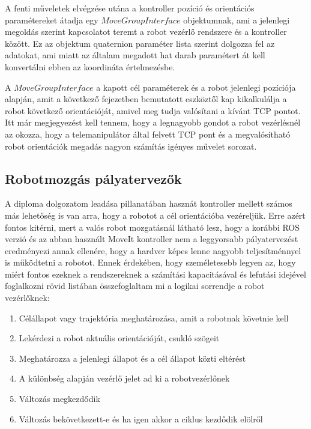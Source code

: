 A fenti műveletek elvégzése utána a kontroller pozíció és orientációs paramétereket átadja egy $MoveGroupInterface$ objektumnak, ami a jelenlegi megoldás szerint kapcsolatot teremt a robot vezérlő rendszere és a kontroller között. Ez az objektum quaternion paraméter lista szerint dolgozza fel az adatokat, ami miatt az általam megadott hat darab paramétert át kell konvertálni ebben az koordináta értelmezésbe.

A $MoveGroupInterface$ a kapott cél paraméterek és a robot jelenlegi pozíciója alapján, amit a következő fejezetben bemutatott eszköztől kap kikalkulálja a robot következő orientációját, amivel meg tudja valósítani a kívánt TCP pontot. Itt már megjegyezést kell tennem, hogy a legnagyobb gondot a robot vezérlésnél az okozza, hogy a telemanipulátor által felvett TCP pont és a megvalósítható robot orientációk megadás nagyon számítás igényes művelet sorozat.

\subsection{Robotmozgás pályatervezők}

A diploma dolgozatom leadása pillanatában hasznát kontroller mellett számos más lehetőség is van arra, hogy a robotot a cél orientációba vezéreljük. Erre azért fontos kitérni, mert a valós robot mozgatásnál látható lesz, hogy a korábbi ROS verzió és az abban használt MoveIt kontroller nem a leggyorsabb pályatervezést eredményezi annak ellenére, hogy a hardver képes lenne nagyobb teljesítménnyel is működtetni a robotot. Ennek érdekében, hogy személetesebb legyen az, hogy miért fontos ezeknek a rendszereknek a számítási kapacitásával és lefutási idejével foglalkozni rövid listában összefoglaltam mi a logikai sorrendje a robot vezérlőknek:

\begin{enumerate}
\item Célállapot vagy trajektória meghatározása, amit a robotnak követnie kell
\item Lekérdezi a robot aktuális orientációját, csukló szögeit
\item Meghatározza a jelenlegi állapot és a cél állapot közti eltérést
\item A különbség alapján vezérlő jelet ad ki a robotvezérlőnek
\item Változás megkezdődik
\item Változás bekövetkezett-e és ha igen akkor a ciklus kezdődik elölről
\end{enumerate}

